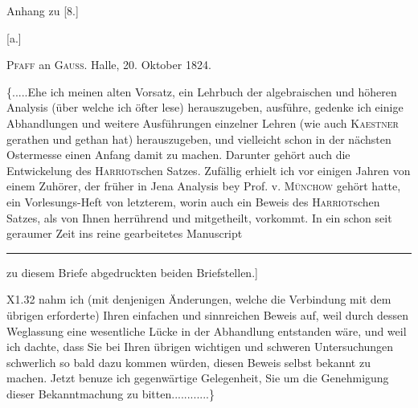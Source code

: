\begin{center}\large Anhang zu [8.]\end{center}
\begin{center}[a.]\par\medskip \textsc{Pfaff} an \textsc{Gauss}. Halle, 20. Oktober 1824.\end{center}
\noindent \{.\enspace .\enspace .\enspace .\enspace .\quad Ehe ich meinen alten Vorsatz, ein Lehrbuch der algebraischen und höheren Analysis (über welche ich öfter lese) herauszugeben, ausführe, gedenke ich einige Abhandlungen und weitere Ausführungen einzelner Lehren (wie auch \textsc{Kaestner} gerathen und gethan hat) herauszugeben, und vielleicht schon in der nächsten Ostermesse einen Anfang damit zu machen. Darunter gehört auch die Entwickelung des \textsc{Harriot}schen Satzes. Zufällig erhielt ich vor einigen Jahren von einem Zuhörer, der früher in Jena Analysis bey Prof. v. \textsc{Münchow} gehört hatte, ein Vorlesungs-Heft von letzterem, worin auch ein Beweis des \textsc{Harriot}schen Satzes, als von Ihnen herrührend und mitgetheilt, vorkommt. In ein schon seit geraumer Zeit ins reine gearbeitetes Manuscript
\par\vfill\noindent\rule{.25\linewidth}{.4pt}\par\smallskip
\begingroup\footnotesize
{}\par
\noindent [**) Siehe die als \textls[120]{Anhang} zu diesem Briefe abgedruckten beiden Briefstellen.]\par
{}\par\endgroup
\smallskip\noindent\small X1.\hfill 32\normalsize
\clearpage
{}
\noindent nahm ich (mit denjenigen Änderungen, welche die Verbindung mit dem übrigen erforderte) Ihren einfachen und sinnreichen Beweis auf, weil durch dessen Weglassung eine wesentliche Lücke in der Abhandlung entstanden wäre, und weil ich dachte, dass Sie bei Ihren übrigen wichtigen und schweren Untersuchungen schwerlich so bald dazu kommen würden, diesen Beweis selbst bekannt zu machen. Jetzt benuze ich gegenwärtige Gelegenheit, Sie um die Genehmigung dieser Bekanntmachung zu bitten.\quad .\enspace .\enspace .\enspace .\enspace .\enspace .\enspace .\enspace .\enspace .\enspace .\enspace .\}


